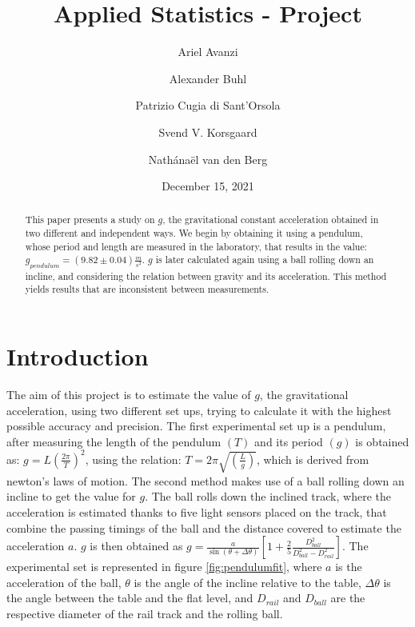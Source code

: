 \documentclass[a4paper,%
               aps,%
               prl,%
               amsfonts,%
               amssymb,%
               amsmath,%
               nobibnotes,%
               twocolumn, %
               twoside,%
               balancelastpage,%
               eqsecnum] %
               {revtex4-1}
\begin{document}
                                

\date{December 15, 2021}
\title{Applied Statistics - Project}
\author{Ariel Avanzi}
\author{Alexander Buhl}
\author{Patrizio Cugia di Sant'Orsola}
\author{Svend V. Korsgaard}
\author{Nathánaël van den Berg}



\begin{abstract}                                              
This paper presents a study on $g$, the gravitational constant acceleration obtained in two different and independent ways. We begin by obtaining it using a pendulum, whose period and length are measured in the laboratory, that results in the value: $g_{pendulum}=(9.82 \pm 0.04)\frac{m}{s^2}$. $g$ is later calculated again using a ball rolling down an incline, and considering the relation between gravity and its acceleration. This method yields results that are inconsistent between measurements.
\end{abstract}

\maketitle 

\section{Introduction}


The aim of this project is to estimate the value of $g$, the gravitational acceleration, using two different set ups,  trying to calculate it with the highest possible accuracy and precision. 
The first experimental set up is a pendulum, after measuring the length of the pendulum $(T)$ and its period $(g)$ is obtained as: $g=L(\frac{2 \pi}{T})^{2}$, using the relation: $T=2 \pi\sqrt{(\frac{L}{g})}$, which is derived from newton's laws of motion.
The second method makes use of a ball rolling down an incline to get the value for $g$. The ball rolls down the inclined track, where the acceleration is estimated thanks to five light sensors placed on the track, that combine the passing timings of the ball and the distance covered to estimate the acceleration $a$. 
$g$ is then obtained as $g=\frac{a}{\sin{(\theta+\Delta\theta)}}[1+\frac{2}{5}\frac{D_{ball}^2}{D_{ball}^2-D_{rail}^2}]$.
The experimental set is represented in figure \ref{fig:pendulumfit}, where $a$ is the acceleration of the ball, $\theta$ is the angle of the incline relative to the table, $\Delta\theta$ is the angle between the table and the flat level, and $D_{rail}$ and $D_{ball}$ are the respective diameter of the rail track and the rolling ball. 
\end{document}
